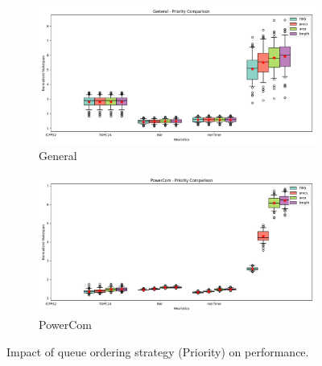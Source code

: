 \documentclass{article}
\begin{document}
\begin{figure}[htbp]
\\[2ex]
\begin{subfigure}[b]{0.32\textwidth}\includegraphics[width=\textwidth]{Results/Priority/Priority_General_boxplot}\caption{General}\label{fig:boxplot_figures_Priority_General}\end{subfigure}
\hfill
\begin{subfigure}[b]{0.32\textwidth}\includegraphics[width=\textwidth]{Results/Priority/Priority_PowerCom_boxplot}\caption{PowerCom}\label{fig:boxplot_figures_Priority_PowerCom}\end{subfigure}
\hfill
\caption{Impact of queue ordering strategy (Priority) on performance.}
\label{fig:boxplot_figures_Priority}
\end{figure}
\end{document}
